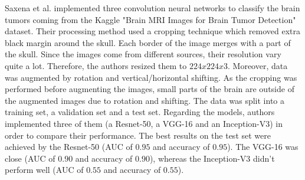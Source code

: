 Saxena et al. \cite{31} implemented three convolution neural networks to classify the brain tumors coming from the Kaggle "Brain MRI Images for Brain Tumor Detection" dataset. Their processing method used a cropping technique which removed extra black margin around the skull. Each border of the image merges with a part of the skull. Since the images come from different sources, their resolution vary quite a lot. Therefore, the authors resized them to $224x224x3$. Moreover, data was augmented by rotation and vertical/horizontal shifting. As the cropping was performed before augmenting the images, small parts of the brain are outside of the augmented images due to rotation and shifting. The data was split into a training set, a validation set and a test set. Regarding the models, authors implemented three of them (a Resnet-50, a VGG-16 and an Inception-V3) in order to compare their performance. The best results on the test set were achieved by the Resnet-50 (AUC of $0.95$ and accuracy of $0.95$). The VGG-16 was close (AUC of $0.90$ and accuracy of $0.90$), whereas the Inception-V3 didn't perform well (AUC of $0.55$ and accuracy of $0.55$).
